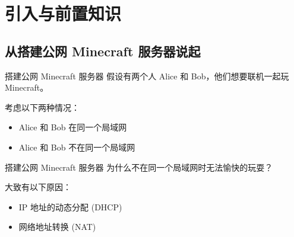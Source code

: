




\maketitle

\section{引入与前置知识}

\subsection{从搭建公网 Minecraft 服务器说起}

\begin{xframe}{搭建公网 Minecraft 服务器}
	假设有两个人 Alice 和 Bob，他们想要联机一起玩 Minecraft。\pause
	
	考虑以下两种情况：\\
	\begin{itemize}
		\item Alice 和 Bob 在同一个局域网
		\item Alice 和 Bob 不在同一个局域网
	\end{itemize}
\end{xframe}

\begin{xframe}{搭建公网 Minecraft 服务器}
	为什么不在同一个局域网时无法愉快的玩耍？ \pause
	
	大致有以下原因：\\
	\begin{itemize}
		\item IP 地址的动态分配 (DHCP)
		\item 网络地址转换 (NAT)
	\end{itemize}
\end{xframe}

% 	
% 	
% 	


